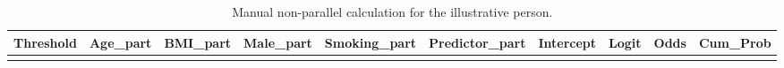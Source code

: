 \documentclass{article}
\begin{document}
\begin{longtable}[]{@{}
  >{\raggedright\arraybackslash}p{}
  >{\raggedleft\arraybackslash}p{}
  >{\raggedleft\arraybackslash}p{}
  >{\raggedleft\arraybackslash}p{}
  >{\raggedleft\arraybackslash}p{}
  >{\raggedleft\arraybackslash}p{}
  >{\raggedleft\arraybackslash}p{}
  >{\raggedleft\arraybackslash}p{}
  >{\raggedleft\arraybackslash}p{}
  >{\raggedleft\arraybackslash}p{}@{}}
\caption{Manual non-parallel calculation for the illustrative
person.}\tabularnewline
\toprule\noalign{}
\begin{minipage}[b]{\linewidth}\raggedright
Threshold
\end{minipage} & \begin{minipage}[b]{\linewidth}\raggedleft
Age\_part
\end{minipage} & \begin{minipage}[b]{\linewidth}\raggedleft
BMI\_part
\end{minipage} & \begin{minipage}[b]{\linewidth}\raggedleft
Male\_part
\end{minipage} & \begin{minipage}[b]{\linewidth}\raggedleft
Smoking\_part
\end{minipage} & \begin{minipage}[b]{\linewidth}\raggedleft
Predictor\_part
\end{minipage} & \begin{minipage}[b]{\linewidth}\raggedleft
Intercept
\end{minipage} & \begin{minipage}[b]{\linewidth}\raggedleft
Logit
\end{minipage} & \begin{minipage}[b]{\linewidth}\raggedleft
Odds
\end{minipage} & \begin{minipage}[b]{\linewidth}\raggedleft
Cum\_Prob
\end{minipage} \\
\midrule\noalign{}
\endfirsthead
\toprule\noalign{}
\begin{minipage}[b]{\linewidth}\raggedright

\end{minipage}
\end{longtable}
\end{document}
